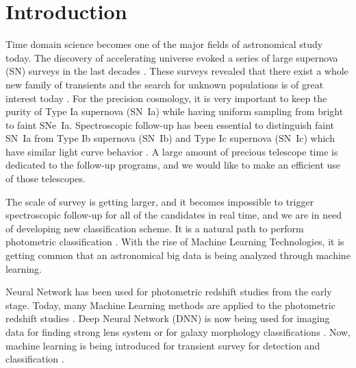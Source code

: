 \documentclass[proof]{pasj01}
\begin{document}
\section{Introduction}
Time domain science becomes one of the major fields of astronomical study today.  The discovery of accelerating universe \citep{perlmutter99a,riess98a} evoked a series of large supernova (SN) surveys in the last decades 
\citep{betoule14a,scolnic18a,brout19a}.  
These surveys revealed that there exist a whole new family of transients and the search for unknown populations is of great interest today \citep{howell06a,phillips07a,quimby07b}. 
For the precision cosmology, it is very important to keep the purity of Type Ia supernova (SN~Ia) while having uniform sampling from bright to faint SNe~Ia.  Spectroscopic follow-up has been essential to distinguish faint SN~Ia from Type Ib supernova (SN~Ib) and Type Ic supernova (SN~Ic) which have similar light curve behavior \citep{scolnic14a}.   A large amount of precious telescope time is dedicated to the follow-up programs, and we would like to make an efficient use of those telescopes.

The scale of survey is getting larger, and it becomes impossible to trigger spectroscopic follow-up for all of the candidates in real time, and we are in need of developing new classification scheme.  It is a natural path to perform photometric classification \citep{sako11a,jonesl8a}.  With the rise of Machine Learning Technologies, it is getting common that an astronomical big data is being analyzed through machine learning.   

Neural Network has been used for photometric redshift studies from the early stage.  Today, many Machine Learning methods are applied to the photometric redshift studies \citep{collister04a,carliles10a,pasquet19a}.
Deep Neural Network (DNN) is now being used for imaging data for finding strong lens system \citep{petrillo17a} or for galaxy morphology classifications \citep{hausen19a}.  Now, machine learning is being introduced for transient survey for detection \citep{goldstein15a} and classification \citep{charnock17a}.
\end{document}
